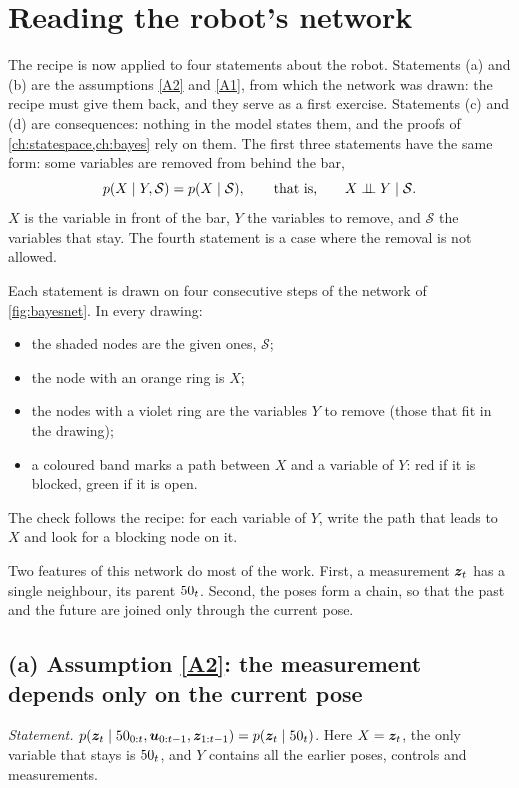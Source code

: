 \section{Reading the robot's network}
\label{sec:bayesnet-mower}

The recipe is now applied to four statements about the robot. Statements
(a) and (b) are the assumptions \ref{A2} and \ref{A1}, from which the
network was drawn: the recipe must give them back, and they serve as a
first exercise. Statements (c) and (d) are consequences: nothing in the
model states them, and the proofs of \cref{ch:statespace,ch:bayes} rely on
them. The first three statements have the same form: some variables are
removed from behind the bar,
\[
  p(X\mid Y,\mathcal S)=p(X\mid\mathcal S),\qquad\text{that is,}\qquad
  X\mathrel{\perp\!\!\!\perp} Y\mid\mathcal S .
\]
$X$ is the variable in front of the bar, $Y$ the variables to remove, and
$\mathcal S$ the variables that stay. The fourth statement is a case where
the removal is not allowed.

Each statement is drawn on four consecutive steps of the network of
\cref{fig:bayesnet}. In every drawing:
\begin{itemize}[nosep]
  \item the shaded nodes are the given ones, $\mathcal S$;
  \item the node with an orange ring is $X$;
  \item the nodes with a violet ring are the variables $Y$ to remove
    (those that fit in the drawing);
  \item a coloured band marks a path between $X$ and a variable of $Y$:
    red if it is blocked, green if it is open.
\end{itemize}
The check follows the recipe: for each variable of $Y$, write the path
that leads to $X$ and look for a blocking node on it.

Two features of this network do most of the work. First, a measurement
$\bm{z}_t$ has a single neighbour, its parent $50_t$. Second, the poses form a
chain, so that the past and the future are joined only through the
current pose.

\subsection*{(a) Assumption \ref{A2}: the measurement depends only on the
current pose}

\emph{Statement.}
$p(\bm{z}_t\mid50_{0:t},\bm{u}_{0:t-1},\bm{z}_{1:t-1})=p(\bm{z}_t\mid50_t)$. Here
$X=\bm{z}_t$, the only variable that stays is $50_t$, and $Y$ contains all the
earlier poses, controls and measurements.


